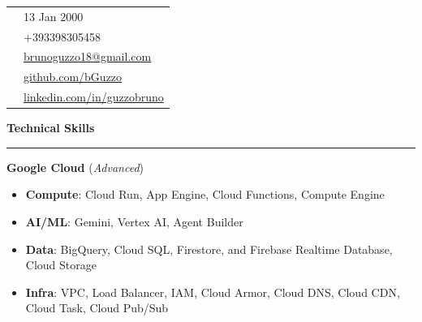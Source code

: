 \documentclass[9pt, a4paper]{article}
\newcommand{\cvsection}[1]{%
	\vspace{2pt}\par
	{\Large\bfseries\color{sectionblue}#1}\par
	\vspace{2pt}\hrule\vspace{6pt}
}
\begin{document}
	\begin{minipage}[t]{0.32\linewidth}
		\vspace{0pt} %
		
		\begin{center}
		\end{center}
		
		\begin{tabularx}{\linewidth}{@{}lX@{}}
			\faBirthdayCake & 13 Jan 2000 \\
			\faPhone & +393398305458 \\
			\faEnvelope & \href{mailto:brunoguzzo18@gmail.com}{brunoguzzo18@gmail.com} \\
			\faGithub & \href{https://github.com/bGuzzo}{github.com/bGuzzo} \\
			\faLinkedin & \href{https://www.linkedin.com/in/guzzobruno/}{linkedin.com/in/guzzobruno} \\
		\end{tabularx}
		\vspace{4pt}
		
		\cvsection{Technical Skills}
		
		{\bfseries Google Cloud} (\textit{Advanced})
		\begin{itemize}[leftmargin=*, nosep, itemsep=2pt]
			\footnotesize
			\item \textbf{Compute}: Cloud Run, App Engine, Cloud Functions, Compute Engine
			\item \textbf{AI/ML}: Gemini, Vertex AI, Agent Builder
			\item \textbf{Data}: BigQuery, Cloud SQL, Firestore, and Firebase Realtime Database, Cloud Storage
			\item \textbf{Infra}: VPC, Load Balancer, IAM, Cloud Armor, Cloud DNS, Cloud CDN, Cloud Task, Cloud Pub/Sub
		\end{itemize}
		\vspace{4pt}
		

\end{minipage}
\end{document}
